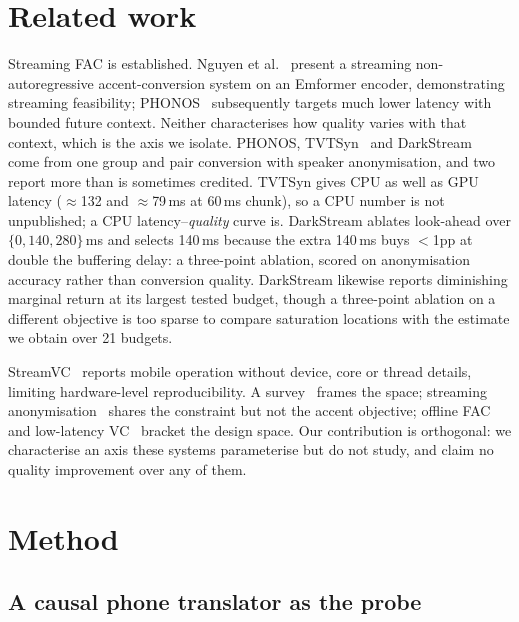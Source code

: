 \documentclass[journal]{IEEEtran}
\begin{document}
\section{Related work}

Streaming FAC is established. Nguyen et al.~\cite{nguyen2025streaming} present
a streaming non-autoregressive accent-conversion system on an Emformer encoder,
demonstrating streaming feasibility; PHONOS~\cite{phonos2026}
subsequently targets much lower latency with bounded future context. Neither
characterises how quality varies with that context, which is the axis we
isolate. PHONOS, TVTSyn~\cite{tvtsyn2026} and DarkStream~\cite{darkstream2025}
come from one group and pair conversion with speaker anonymisation, and two
report more than is sometimes credited. TVTSyn gives CPU as well as GPU latency
($\approx$132 and $\approx$79\,ms at 60\,ms chunk), so a CPU number is not
unpublished; a CPU latency--\emph{quality} curve is. DarkStream ablates
look-ahead over $\{0,140,280\}$\,ms and selects 140\,ms because the extra
140\,ms buys $<$1pp at double the buffering delay: a three-point ablation,
scored on anonymisation accuracy rather than conversion quality. DarkStream
likewise reports diminishing marginal return at its largest tested budget,
though a three-point ablation on a different objective is too sparse to compare
saturation locations with the estimate we obtain over 21 budgets.

StreamVC~\cite{streamvc2024} reports mobile operation without device, core or
thread details, limiting hardware-level reproducibility. A
survey~\cite{acsurvey2026} frames the space; streaming
anonymisation~\cite{streamvoiceanon2026, streamvoiceanonplus2026, e2eanon2024}
shares the constraint but not the accent objective; offline
FAC~\cite{zhao2021fac, accentron2022} and low-latency VC~\cite{llvc2023}
bracket the design space. Our contribution is orthogonal: we characterise an
axis these systems parameterise but do not study, and claim no quality
improvement over any of them.

\section{Method}

\subsection{A causal phone translator as the probe}
\label{sec:method-translator}
\end{document}
